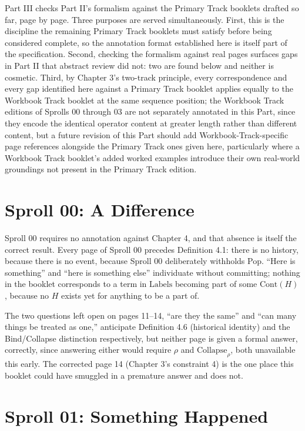 \documentclass[11pt,twoside]{book}
\begin{document}
Part III checks Part II's formalism against the Primary Track booklets drafted so far, page by page. Three purposes are served simultaneously. First, this is the discipline the remaining Primary Track booklets must satisfy before being considered complete, so the annotation format established here is itself part of the specification. Second, checking the formalism against real pages surfaces gaps in Part II that abstract review did not: two are found below and neither is cosmetic. Third, by Chapter 3's two-track principle, every correspondence and every gap identified here against a Primary Track booklet applies equally to the Workbook Track booklet at the same sequence position; the Workbook Track editions of Sprolls 00 through 03 are not separately annotated in this Part, since they encode the identical operator content at greater length rather than different content, but a future revision of this Part should add Workbook-Track-specific page references alongside the Primary Track ones given here, particularly where a Workbook Track booklet's added worked examples introduce their own real-world groundings not present in the Primary Track edition.

\chapter{Sproll 00: A Difference}

Sproll 00 requires no annotation against Chapter 4, and that absence is itself the correct result. Every page of Sproll 00 precedes Definition 4.1: there is no history, because there is no event, because Sproll 00 deliberately withholds Pop. ``Here is something'' and ``here is something else'' individuate without committing; nothing in the booklet corresponds to a term in $\mathrm{Labels}$ becoming part of some $\mathrm{Cont}(H)$, because no $H$ exists yet for anything to be a part of.

The two questions left open on pages 11--14, ``are they the same'' and ``can many things be treated as one,'' anticipate Definition 4.6 (historical identity) and the Bind/Collapse distinction respectively, but neither page is given a formal answer, correctly, since answering either would require $\rho$ and $\mathrm{Collapse}_\rho$, both unavailable this early. The corrected page 14 (Chapter 3's constraint 4) is the one place this booklet could have smuggled in a premature answer and does not.

\chapter{Sproll 01: Something Happened}
\end{document}
